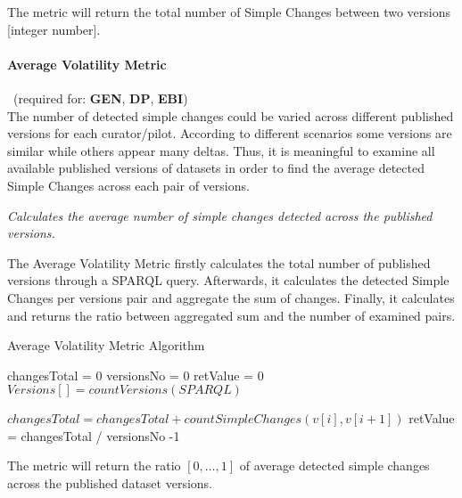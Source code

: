 The metric will return the total number of Simple Changes between two versions [integer number].


\paragraph{Average Volatility Metric}~(required for: \textbf{GEN}, \textbf{DP}, \textbf{EBI})~\\ %
The number of detected simple changes could be varied across different published versions for each curator/pilot. According to different scenarios some versions are similar while others appear many deltas. Thus, it is meaningful to examine all available published versions of datasets in order to find the average detected Simple Changes across each pair of versions. 

\begin{mdframed}[style=metricdefinition]
\emph{Calculates the average number of simple changes detected across the published versions.}
\end{mdframed}

The Average Volatility Metric firstly calculates the total number of published versions through a SPARQL query. Afterwards, it calculates the detected Simple Changes per versions pair and aggregate the sum of changes. Finally, it calculates and returns the ratio between aggregated sum and the number of examined pairs.

\begin{algorithm}
\caption{Average Volatility Metric Algorithm}
\begin{algorithmic}[1]

\State changesTotal = 0
\State versionsNo = 0
\State retValue = 0
\EndProcedure
{}
\State $ Versions [] = countVersions (SPARQL)$

\State $changesTotal = changesTotal + countSimpleChanges(v[i],v[i+1])$
\EndFor
\EndProcedure
\State retValue = changesTotal / versionsNo -1
\State {}
\end{algorithmic}
\end{algorithm}

The metric will return the ratio $[0,\ldots,1]$ of average detected simple changes across the published dataset versions. 

